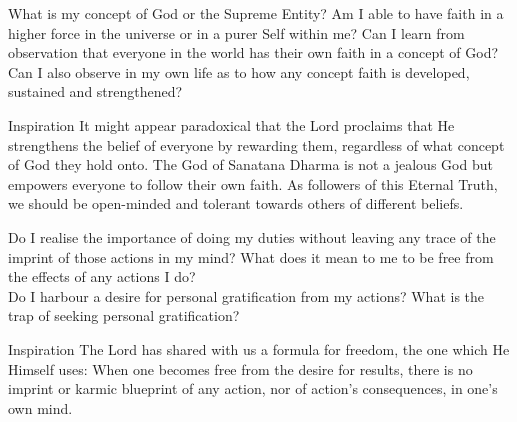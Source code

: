 



\newpage
\begin{mananam}{} 
\mananamtext What is my concept of God or the Supreme Entity? Am I able to have faith in a higher force in the universe or in a purer Self within me? Can I learn from observation that everyone in the world has their own faith in a concept of God? Can I also observe in my own life as to how any concept faith is developed, sustained and strengthened?
\end{mananam}
\WritingHand{}
\begin{inspiration}{\mananamfont Inspiration}
\mananamtext It might appear paradoxical that the Lord proclaims that He strengthens the belief of everyone by rewarding them, regardless of what concept of God they hold onto. The God of Sanatana Dharma is not a jealous God but empowers everyone to follow their own faith. As followers of this Eternal Truth, we should be open-minded and tolerant towards others of different beliefs. 
\end{inspiration}
\newpage




\newpage
\begin{mananam}{} 
\mananamtext Do I realise the importance of doing my duties without leaving any trace of the imprint of those actions in my mind? What does it mean to me to be free from the effects of any actions I do?\\
Do I harbour a desire for personal gratification from my actions? What is the trap of seeking personal gratification?
\end{mananam}
\WritingHand{}
\begin{inspiration}{\mananamfont Inspiration}
\mananamtext The Lord has shared with us a formula for freedom, the one which He Himself uses: When one becomes free from the desire for results, there is no imprint or karmic blueprint of any action, nor of action’s consequences, in one’s own mind. 
\end{inspiration}
\newpage

